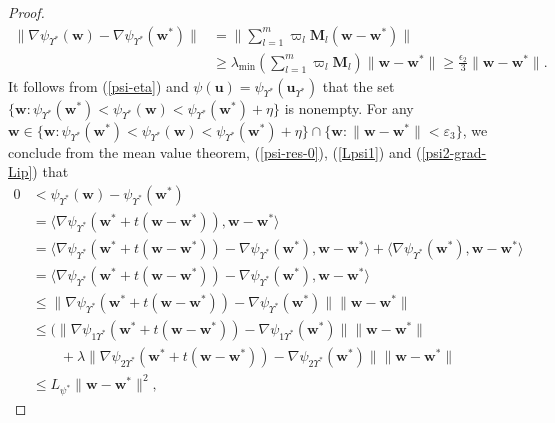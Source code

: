 \documentclass{article}
\numberwithin{equation}{section}
\begin{document}
\begin{proof}
\begin{equation}\label{grad-diff-bound}
	\begin{aligned}
		\|\nabla\psi_{\Upsilon^*}(\mathbf{w})-\nabla\psi_{\Upsilon^*}(\mathbf{w}^*)\|&=
		\|\sum_{l=1}^m{\varpi}_l\mathbf{M}_l(\mathbf{w}-\mathbf{w}^*)\|\\
		&\geq\lambda_{\mathrm{min}}(\sum_{l=1}^m{\varpi}_l\mathbf{M}_l)\|\mathbf{w}-\mathbf{w}^*\|
		\geq\frac{\epsilon_2}{3}\|\mathbf{w}-\mathbf{w}^*\|.
	\end{aligned}
\end{equation}
It follows from (\ref{psi-eta}) and $\psi(\mathbf{u})=\psi_{\Upsilon^*}(\mathbf{u}_{\Upsilon^*})$ that the set $\{\mathbf{w}: \psi_{\Upsilon^*}(\mathbf{w}^*)<\psi_{\Upsilon^*}(\mathbf{w})<\psi_{\Upsilon^*}(\mathbf{w}^*)+\eta\}$ is nonempty. For any $\mathbf{w}\in\{\mathbf{w}: \psi_{\Upsilon^*}(\mathbf{w}^*)<\psi_{\Upsilon^*}(\mathbf{w})<\psi_{\Upsilon^*}(\mathbf{w}^*)+\eta\}\cap\{\mathbf{w}: \|\mathbf{w}-\mathbf{w}^*\|<\varepsilon_3\}$,
we conclude from the mean value theorem, (\ref{psi-res-0}), (\ref{Lpsi1}) and (\ref{psi2-grad-Lip}) that
\begin{equation}\label{mvt-psi}
	\begin{aligned}
		0&<\psi_{\Upsilon^*}(\mathbf{w})-\psi_{\Upsilon^*}(\mathbf{w}^*)\\
		&=
		\langle\nabla\psi_{\Upsilon^*}(\mathbf{w}^*+t(\mathbf{w}-\mathbf{w}^*)), \mathbf{w}-\mathbf{w}^*\rangle\\
		&=\langle\nabla\psi_{\Upsilon^*}(\mathbf{w}^*+t(\mathbf{w}-\mathbf{w}^*))-\nabla\psi_{\Upsilon^*}(\mathbf{w}^*), \mathbf{w}-\mathbf{w}^*\rangle
		+\langle\nabla\psi_{\Upsilon^*}(\mathbf{w}^*), \mathbf{w}-\mathbf{w}^*\rangle\\
		&=\langle\nabla\psi_{\Upsilon^*}(\mathbf{w}^*+t(\mathbf{w}-\mathbf{w}^*))-\nabla\psi_{\Upsilon^*}(\mathbf{w}^*), \mathbf{w}-\mathbf{w}^*\rangle\\
		&\leq\|\nabla\psi_{\Upsilon^*}(\mathbf{w}^*+t(\mathbf{w}-\mathbf{w}^*))-\nabla\psi_{\Upsilon^*}(\mathbf{w}^*)\|\|\mathbf{w}-\mathbf{w}^*\|\\
		&\leq (\|\nabla\psi_{1\Upsilon^*}(\mathbf{w}^*+t(\mathbf{w}-\mathbf{w}^*))-\nabla\psi_{1\Upsilon^*}(\mathbf{w}^*)\|\|\mathbf{w}-\mathbf{w}^*\|\\
		&\qquad+\lambda\|\nabla\psi_{2\Upsilon^*}(\mathbf{w}^*+t(\mathbf{w}-\mathbf{w}^*))-\nabla\psi_{2\Upsilon^*}(\mathbf{w}^*)\|\|\mathbf{w}-\mathbf{w}^*\|\\
		&\leq L_{\psi^*}\|\mathbf{w}-\mathbf{w}^*\|^2,
	\end{aligned}\nonumber

\end{equation}
\end{proof}
\end{document}
